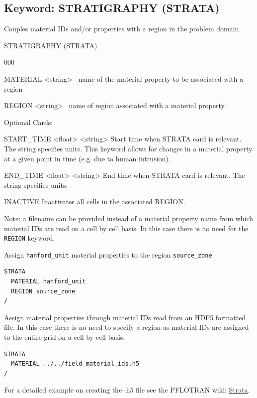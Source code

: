 \subsection{Keyword: STRATIGRAPHY (STRATA)}

\hfill\hyperlink{target_key}{\return}

Couples material IDs and/or properties with a region in the problem domain.

\begin{deflist}{00}
\item[STRATIGRAPHY (STRATA)] ~
\begin{deflist}{000}
\item[MATERIAL] <string> \ name of the material property to be associated with a region
\item[REGION] <string> \ name of region associated with a material property

\item[Optional Cards:]~
\begin{deflist}{00}
\item[START\_TIME] <float> <string>
Start time when STRATA card is relevant. The string specifies units. This keyword allows for changes in a material property at a given point in time (e.g. due to human intrusion).
\item[END\_TIME] <float> <string>
End time when STRATA card is relevant. The string specifies units.
\item[INACTIVE]
Inactivates all cells in the associated REGION.
\end{deflist}
\end{deflist}
\item[\keyend]
\end{deflist}

\noindent
Note: a filename can be provided instead of a material property name from which material IDs are read on a cell by cell basis. In this case there is no need for the {\tt REGION} keyword.

\begin{mdframed}


\noindent
Assign {\tt hanford\_unit} material properties to the region {\tt source\_zone}

\footnotesize
\begin{verbatim}
STRATA
  MATERIAL hanford_unit
  REGION source_zone
/
\end{verbatim}
\normalsize

\noindent
Assign material properties through material IDs read from an HDF5 formatted file. In this case there is no need to specify a region as material IDs are assigned to the entire grid on a cell by cell basis.

\footnotesize
\begin{verbatim}
STRATA
  MATERIAL ../../field_material_ids.h5
/
\end{verbatim}
\normalsize

\noindent For a detailed example on creating the .h5 file see the PFLOTRAN wiki: \href{https://bitbucket.org/pflotran/pflotran-dev/wiki/Documentation/Strata}{Strata}.
\end{mdframed}

